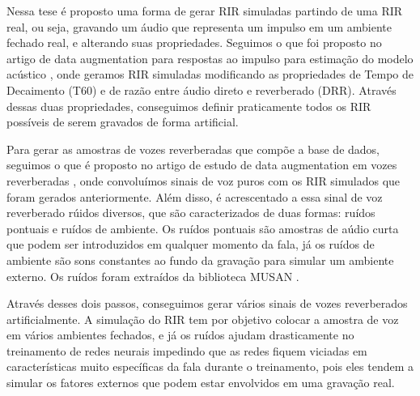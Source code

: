 \documentclass[a4paper,12pt,oneside,openany]{report}
\begin{document}
Nessa tese é proposto uma forma de gerar RIR simuladas partindo de uma RIR real, ou seja,
gravando um áudio que representa um impulso em um ambiente fechado real, e alterando
suas propriedades. Seguimos o que foi proposto no artigo de data augmentation
para respostas ao impulso para estimação do modelo acústico \cite{RIR_Data_Aug}, onde
geramos RIR simuladas modificando as propriedades de Tempo de Decaimento (T60) e de
razão entre áudio direto e reverberado (DRR). Através dessas duas propriedades, conseguimos
definir praticamente todos os RIR possíveis de serem gravados de forma artificial.

Para gerar as amostras de vozes reverberadas que compõe a base de dados, seguimos o
que é proposto no artigo de estudo de data augmentation em vozes reverberadas
\cite{Speech_Rec}, onde convoluímos sinais de voz puros com os RIR simulados que 
foram gerados anteriormente. Além disso, é acrescentado a essa sinal de voz reverberado
rúidos diversos, que são caracterizados de duas formas: ruídos pontuais e ruídos de ambiente.
Os ruídos pontuais são amostras de aúdio curta que podem ser introduzidos em qualquer momento
da fala, já os ruídos de ambiente são sons constantes ao fundo da gravação para simular
um ambiente externo. Os ruídos foram extraídos da biblioteca MUSAN \cite{noiseLib}.

Através desses dois passos, conseguimos gerar vários sinais de vozes reverberados artificialmente.
A simulação do RIR tem por objetivo colocar a amostra de voz em vários ambientes fechados,
e já os ruídos ajudam drasticamente no treinamento de redes neurais impedindo que
as redes fiquem viciadas em características muito específicas da fala durante o treinamento, 
pois eles tendem a simular os fatores externos que podem estar envolvidos em uma
gravação real.

  
\end{document}

